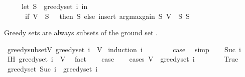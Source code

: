 \begin{isabellebody}
\ \ \ \ \ {\isacharparenleft}{\kern0pt}let\ S\ {\isacharequal}{\kern0pt}\ greedy{\isacharunderscore}{\kern0pt}set\ i\ in\isanewline
\ \ \ \ \ \ if\ V\ {\isacharminus}{\kern0pt}\ S\ {\isacharequal}{\kern0pt}\ {\isacharbraceleft}{\kern0pt}{\isacharbraceright}{\kern0pt}\ then\ S\ else\ insert\ {\isacharparenleft}{\kern0pt}argmax{\isacharunderscore}{\kern0pt}gain\ S\ {\isacharparenleft}{\kern0pt}V\ {\isacharminus}{\kern0pt}\ S{\isacharparenright}{\kern0pt}{\isacharparenright}{\kern0pt}\ S{\isacharparenright}{\kern0pt}{\isachardoublequoteclose}%
\begin{isamarkuptext}%
Greedy sets are always subsets of the ground set .%
\end{isamarkuptext}\isamarkuptrue%
\isamarkupfalse%
\ greedy{\isacharunderscore}{\kern0pt}subset{\isacharunderscore}{\kern0pt}V{\isacharcolon}{\kern0pt}\ {\isachardoublequoteopen}greedy{\isacharunderscore}{\kern0pt}set\ i\ {\isasymsubseteq}\ V{\isachardoublequoteclose}\isanewline
%
\isadelimproof
%
\endisadelimproof
%
\isatagproof
{}\isamarkupfalse%
\ {\isacharparenleft}{\kern0pt}induction\ i{\isacharparenright}{\kern0pt}\isanewline
\ \ \isamarkupfalse%
\ {}\isanewline
\ \ \isamarkupfalse%
\ {\isacharquery}{\kern0pt}case\ \isamarkupfalse%
\ simp\isanewline
{}\isamarkupfalse%
\isanewline
\ \ \isamarkupfalse%
\ {\isacharparenleft}{\kern0pt}Suc\ i{\isacharparenright}{\kern0pt}\isanewline
\ \ \isamarkupfalse%
\ IH{\isacharcolon}{\kern0pt}\ {\isachardoublequoteopen}greedy{\isacharunderscore}{\kern0pt}set\ i\ {\isasymsubseteq}\ V{\isachardoublequoteclose}\ \isamarkupfalse%
\ fact\isanewline
\ \ \isamarkupfalse%
\ {\isacharquery}{\kern0pt}case\isanewline
\ \ \isamarkupfalse%
\ {\isacharparenleft}{\kern0pt}cases\ {\isachardoublequoteopen}V\ {\isacharminus}{\kern0pt}\ greedy{\isacharunderscore}{\kern0pt}set\ i\ {\isacharequal}{\kern0pt}\ {\isacharbraceleft}{\kern0pt}{\isacharbraceright}{\kern0pt}{\isachardoublequoteclose}{\isacharparenright}{\kern0pt}\isanewline
\ \ \ \ \isamarkupfalse%
\ True\isanewline
\ \ \ \ \isamarkupfalse%
\ {\isachardoublequoteopen}greedy{\isacharunderscore}{\kern0pt}set\ {\isacharparenleft}{\kern0pt}Suc\ i{\isacharparenright}{\kern0pt}\ {\isacharequal}{\kern0pt}\ greedy{\isacharunderscore}{\kern0pt}set\ i{\isachardoublequoteclose}\isanewline
\ \ \ \ \ \ \isamarkupfalse%

\end{isabellebody}
